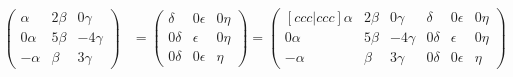 \documentclass[letterpaper]{article}
\renewcommand{\*}{\cdot}
\theoremstyle{definition}
\begin{document}
	\begin{align*}
		\begin{pmatrix}
			\alpha & 2\beta & 0\gamma\\
			0\alpha & 5\beta & -4\gamma\\
			-\alpha & \beta & 3\gamma
		\end{pmatrix}
		&= 		\begin{pmatrix}
		\delta & 0\epsilon & 0\eta\\
		0\delta & \epsilon & 0\eta\\
		0\delta & 0\epsilon & \eta
		\end{pmatrix}  = 		 \begin{pmatrix}[ccc|ccc]
		\alpha & 2\beta & 0\gamma & \delta & 0\epsilon & 0\eta\\
		0\alpha & 5\beta & -4\gamma& 0\delta & \epsilon & 0\eta\\
		-\alpha & \beta & 3\gamma & 0\delta & 0\epsilon & \eta
		\end{pmatrix} 
	\end{align*}
\end{document}
